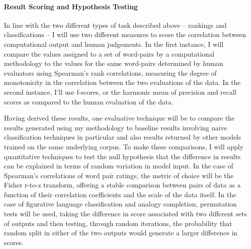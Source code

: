\paragraph{Result Scoring and Hypothesis Testing} In line with the two different types of task described above -- rankings and classifications -- I will use two different measures to score the correlation between computational output and human judgements.  In the first instance, I will compare the values assigned to a set of word-pairs by a computational methodology to the values for the same word-pairs determined by human evaluators using Spearman's rank correlations, measuring the degree of monotonicity in the correlation between the two evaluations of the data.  In the second instance, I'll use f-scores, or the harmonic mean of precision and recall scores as compared to the human evaluation of the data.

Having derived these results, one evaluative technique will be to compare the results generated using my methodology to baseline results involving naive classification techniques in particular and also results returned by other models trained on the same underlying corpus.  To make these comparisons, I will apply quantitative techniques to test the null hypothesis that the difference in results can be explained in terms of random variation in model input.  In the case of Spearman's correlations of word pair ratings, the metric of choice will be the Fisher r-to-z transform, offering a stable comparison between pairs of data as a function of their correlation coefficients and the scale of the data itself.  In the case of figurative language classification and analogy completion, permutation tests will be used, taking the difference in score associated with two different sets of outputs and then testing, through random iterations, the probability that random split in either of the two outputs would generate a larger difference in scores.   \cite{RastogiEA2015}  \cite{FaruquiEA2016} 

